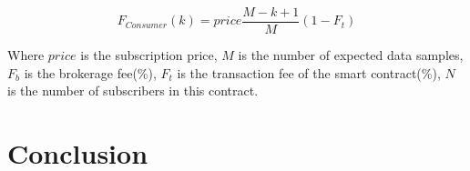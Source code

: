 \documentclass[journal,a4paper]{IEEEtran}
\begin{document}
\begin{equation}
F_{Consumer}(k) = price \frac{M-k+1}{M} (1-F_{t})
\end{equation}

Where $price$  is the subscription price, $M$ is the number of expected data samples, $F_{b}$ is the brokerage fee(\%), $F_{t}$ is the transaction fee of the smart contract(\%), $N$ is the number of subscribers in this contract.

\section{Conclusion}



  







\end{document}
